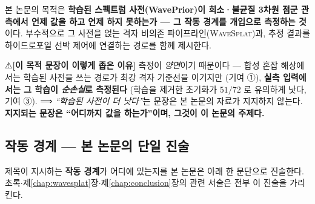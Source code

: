 \documentclass[11pt]{report}
\numberwithin{equation}{chapter}
\numberwithin{figure}{chapter}
\numberwithin{table}{chapter}
\newcommand{\WS}{\textsc{WaveSplat}}
\begin{document}
\medskip
본 논문의 목적은 \textbf{학습된 스펙트럼 사전(WavePrior)이 희소·불균질 3차원 점군
관측에서 언제 값을 하고 언제 하지 못하는가 --- 그 작동 경계를 개입으로 측정하는 것}이다.
부수적으로 그 사전을 얹는 격자 비의존 파이프라인(\WS{})과, 추정 결과를 하이드로포일
선박 제어에 연결하는 경로를 함께 제시한다.

⚠\textbf{[이 목적 문장이 이렇게 좁은 이유]} 측정이 \emph{양면}이기 때문이다 ---
합성 혼잡 해상에서는 학습된 사전을 쓰는 경로가 최강 격자 기준선을 이기지만
(기여 ①), \textbf{실측 입력에서는 그 학습이 \emph{순손실}로 측정된다}
(학습을 제거한 초기화가 $51/72$ 로 유의하게 낫다, 기여 ③).
⟹ \emph{``학습된 사전이 더 낫다''}는 문장은 본 논문의 자료가 지지하지 않는다.
\textbf{지지되는 문장은 ``어디까지 값을 하는가''이며, 그것이 이 논문의 주제다.}

\subsection*{작동 경계 --- 본 논문의 단일 진술}
\label{sec:boundary}

제목이 지시하는 \textbf{작동 경계}가 어디에 있는지를 본 논문은 아래 한 문단으로
진술한다. 초록$\cdot$제\ref{chap:wavesplat}장$\cdot$제\ref{chap:conclusion}장의 관련
서술은 전부 이 진술을 가리킨다.
\end{document}
